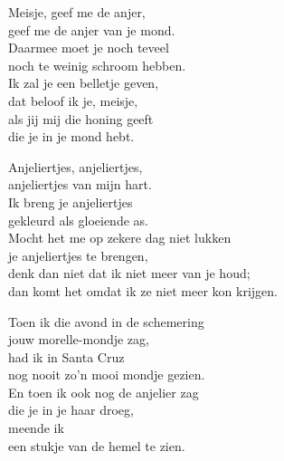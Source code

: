 \clearpage
\begin{translation}
Meisje, geef me de anjer,\\
geef me de anjer van je mond.\\
Daarmee moet je noch teveel\\
noch te weinig schroom hebben.\\
Ik zal je een belletje geven,\\
dat beloof ik je, meisje,\\
als jij mij die honing geeft\\
die je in je mond hebt.\vspace{\wlskip}

Anjeliertjes, anjeliertjes,\\
anjeliertjes van mijn hart.\\
Ik breng je anjeliertjes\\
gekleurd als gloeiende as.\\
Mocht het me op zekere dag niet lukken\\
je anjeliertjes te brengen,\\
denk dan niet dat ik niet meer van je houd;\\
dan komt het omdat ik ze niet meer kon krijgen.\vspace{\wlskip}

Toen ik die avond in de schemering\\
jouw morelle-mondje zag,\\
had ik in Santa Cruz\\
nog nooit zo'n mooi mondje gezien.\\
En toen ik ook nog de anjelier zag\\
die je in je haar droeg,\\
meende ik\\
een stukje van de hemel te zien.
\end{translation}
